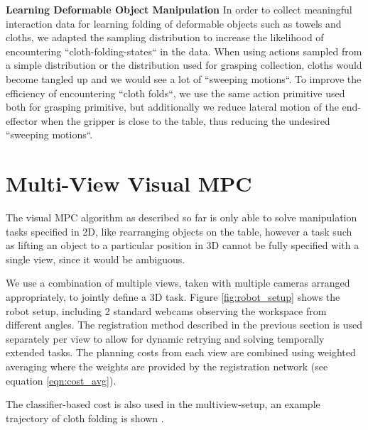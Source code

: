 \textbf{Learning Deformable Object Manipulation}
In order to collect meaningful interaction data for learning folding of deformable objects such as towels and cloths, we adapted the sampling distribution to increase the likelihood of encountering ``cloth-folding-states`` in the data. When using actions sampled from a simple distribution or the distribution used for grasping collection, cloths would become tangled up and we would see a lot of ``sweeping motions``. To improve the efficiency of encountering ``cloth folds``, we use the same action primitive used both for grasping primitive, but additionally we reduce lateral motion of the end-effector when the gripper is close to the table, thus reducing the undesired ``sweeping motions``.

\section{Multi-View Visual MPC}
The visual MPC algorithm as described so far is only able to solve manipulation tasks specified in 2D, like rearranging objects on the table, however a task such as lifting an object to a particular position in 3D cannot be fully specified with a single view, since it would be ambiguous. 

We use a combination of multiple views, taken with multiple cameras arranged appropriately, to jointly define a 3D task. Figure \ref{fig:robot_setup} shows the robot setup, including 2 standard webcams observing the workspace from different angles. The registration method described in the previous section is used separately per view to allow for dynamic retrying and solving temporally extended tasks. The planning costs from each view are combined using weighted averaging where the weights are provided by the registration network (see equation \ref{eqn:cost_avg}).  

The classifier-based cost is also used in the multiview-setup, an example trajectory of cloth folding is shown . 






